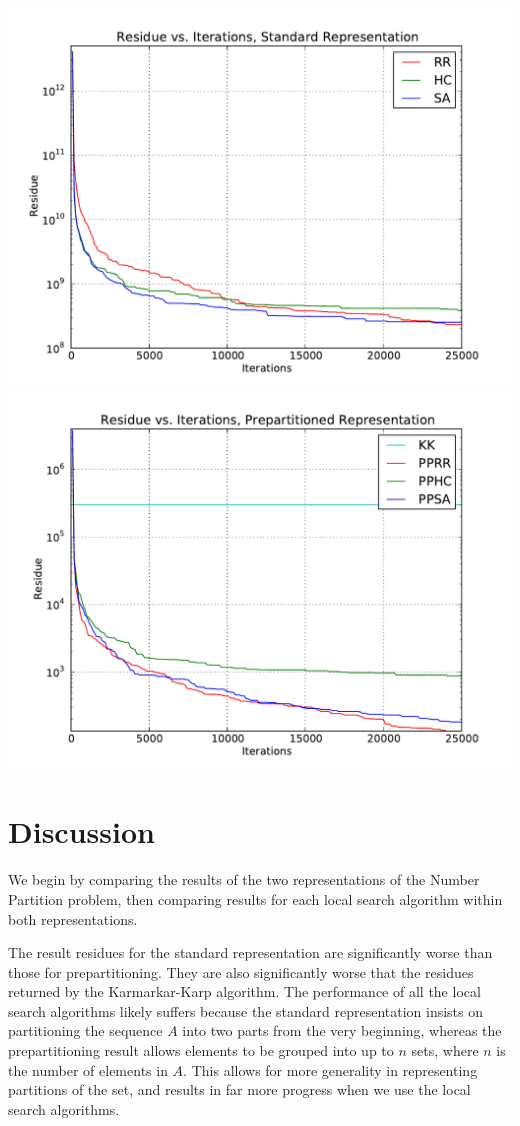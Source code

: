 \documentclass[solution, letterpaper]{cs121}
\begin{document}
\begin{center}
\includegraphics[scale=0.72]{residue-v-iteration-standard.pdf}
\includegraphics[scale=0.72]{residue-v-iteration-prepartition.pdf}
\end{center}

\section*{Discussion}
\hspace{4mm} We begin by comparing the results of the two representations of the Number Partition problem, then comparing results for each local search algorithm within both representations.

The result residues for the standard representation are significantly worse than those for prepartitioning. They are also significantly worse that the residues returned by the Karmarkar-Karp algorithm. The performance of all the local search algorithms likely suffers because the standard representation insists on partitioning the sequence $A$ into two parts from the very beginning, whereas the prepartitioning result allows elements to be grouped into up to $n$ sets, where $n$ is the number of elements in $A$. This allows for more generality in representing partitions of the set, and results in far more progress when we use the local search algorithms.
\end{document}
